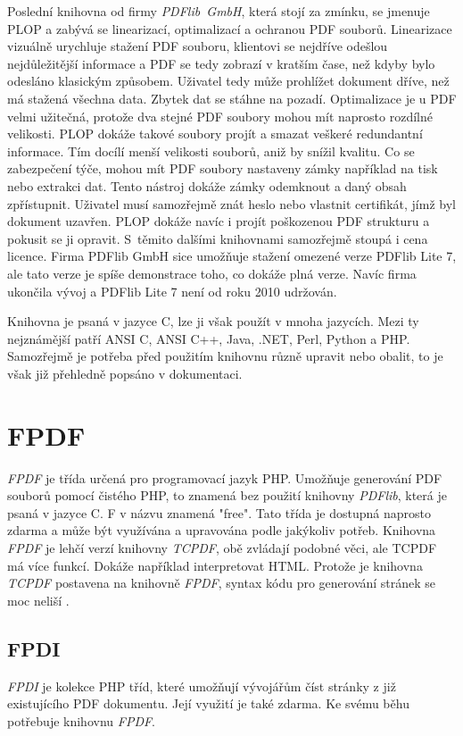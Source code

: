 \documentclass[czech,BP]{thesiskiv}
\begin{document}
Poslední knihovna od firmy \mbox{\emph{PDFlib GmbH}}, která stojí za zmínku, se jmenuje PLOP a zabývá se linearizací, optimalizací a ochranou PDF souborů. Linearizace vizuálně urychluje stažení PDF souboru, klientovi se nejdříve odešlou nejdůležitější informace a PDF se tedy zobrazí v kratším čase, než kdyby bylo odesláno klasickým způsobem. Uživatel tedy může prohlížet dokument dříve, než má stažená všechna data. Zbytek dat se stáhne na pozadí. Optimalizace je u PDF velmi užitečná, protože dva stejné PDF soubory mohou mít naprosto rozdílné velikosti. PLOP dokáže takové soubory projít a smazat veškeré redundantní informace. Tím docílí menší velikosti souborů, aniž by snížil kvalitu. Co se zabezpečení týče, mohou mít PDF soubory nastaveny zámky například na tisk nebo extrakci dat. Tento nástroj dokáže zámky odemknout a daný obsah zpřístupnit. Uživatel musí samozřejmě znát heslo nebo vlastnit certifikát, jímž byl dokument uzavřen. PLOP dokáže navíc i projít poškozenou PDF strukturu a pokusit se ji opravit. S~těmito dalšími knihovnami samozřejmě stoupá i cena licence. Firma PDFlib GmbH sice umožňuje stažení omezené verze PDFlib Lite 7, ale tato verze je spíše demonstrace toho, co dokáže plná verze. Navíc firma ukončila vývoj a PDFlib Lite 7 není od roku 2010 udržován\cite{PDFlib}.

Knihovna je psaná v jazyce C, lze ji však použít v mnoha jazycích. Mezi ty nejznámější patří ANSI C, ANSI C++, Java, .NET, Perl, Python a PHP. Samozřejmě je potřeba před použitím knihovnu různě upravit nebo obalit, to je však již přehledně popsáno v dokumentaci\cite{PDFlib_Manual}.

  
\section{FPDF}
\emph{FPDF} je třída určená pro programovací jazyk PHP. Umožňuje generování PDF souborů pomocí čistého PHP, to znamená bez použití knihovny \emph{PDFlib}, která je psaná v jazyce C. F v názvu znamená "free". Tato třída je dostupná naprosto zdarma a může být využívána a upravována podle jakýkoliv potřeb. Knihovna \emph{FPDF} je lehčí verzí knihovny \emph{TCPDF}, obě zvládají podobné věci, ale TCPDF má více funkcí. Dokáže například interpretovat HTML. Protože je knihovna \emph{TCPDF} postavena na knihovně \emph{FPDF}, syntax kódu pro generování stránek se moc neliší \cite{FPDF}\cite{FPDF_Book}. 
\subsection{FPDI}
\emph{FPDI} je kolekce PHP tříd, které umožňují vývojářům číst stránky z již existujícího PDF dokumentu. Její využití je také zdarma. Ke svému běhu potřebuje knihovnu \emph{FPDF}\cite{FPDI}.
\end{document}
